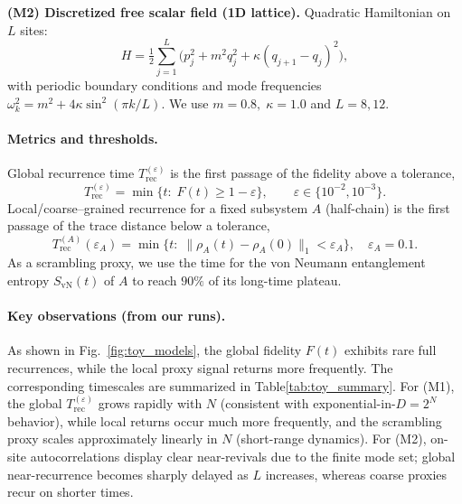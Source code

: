 \documentclass[12pt]{article}
\newcommand{\Trec}{T_{\text{rec}}}
\newcommand{\TrecA}{T^{(A)}_{\text{rec}}}
\theoremstyle{remark}
\begin{document}
\noindent
\textbf{(M2) Discretized free scalar field (1D lattice).}
Quadratic Hamiltonian on \(L\) sites:
\[
H=\tfrac12\sum_{j=1}^{L}\!\big(p_j^2+m^2 q_j^2+\kappa (q_{j+1}-q_j)^2\big),
\]
with periodic boundary conditions and mode frequencies
\(\omega_k^2=m^2+4\kappa\sin^2(\pi k/L)\).
We use \(m=0.8,\;\kappa=1.0\) and \(L=8,12\).

\paragraph{Metrics and thresholds.}
Global recurrence time \(\Trec^{(\varepsilon)}\) is the first passage of the fidelity above a tolerance,
\[
\Trec^{(\varepsilon)}=\min\{t:\; F(t)\ge 1-\varepsilon\},\qquad \varepsilon\in\{10^{-2},10^{-3}\}.
\]
Local/coarse–grained recurrence for a fixed subsystem \(A\) (half-chain) is the first passage of the trace distance below a tolerance,
\[
\TrecA(\varepsilon_A)=\min\{t:\;\|\rho_A(t)-\rho_A(0)\|_1<\varepsilon_A\},\quad \varepsilon_A=0.1.
\]
As a scrambling proxy, we use the time for the von Neumann entanglement entropy \(S_{\mathrm{vN}}(t)\) of \(A\) to reach \(90\%\) of its long-time plateau.

\paragraph{Key observations (from our runs).}
As shown in Fig.~\ref{fig:toy_models}, the global fidelity $F(t)$ exhibits rare full recurrences, while the local proxy signal returns more frequently. The corresponding timescales are summarized in Table\ref{tab:toy_summary}.
For (M1), the global \(\Trec^{(\varepsilon)}\) grows rapidly with \(N\) (consistent with exponential-in-\(D=2^N\) behavior),
while local returns occur much more frequently, and the scrambling proxy scales approximately linearly in \(N\) (short-range dynamics).
For (M2), on-site autocorrelations display clear near-revivals due to the finite mode set; global near-recurrence becomes sharply delayed as \(L\) increases, whereas coarse proxies recur on shorter times.
\end{document}
